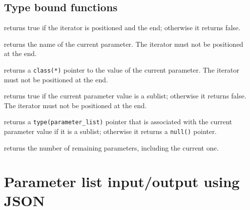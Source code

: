 \documentclass[11pt]{article}
\begin{document}
\subsection{Type bound functions}
\begin{description}[style=nextline]\setlength{\itemsep}{0pt}
\item[\texttt{at_end()}]
  returns true if the iterator is positioned and the end; otherwise it
  returns false.
\item[\texttt{name()}]
  returns the name of the current parameter.  The iterator must not be
  positioned at the end.
\item[\texttt{value()}]
  returns a \texttt{class(*)} pointer to the value of the current parameter.
  The iterator must not be positioned at the end.
\item[\texttt{is_list()}]
  returns true if the current parameter value is a sublist; otherwise it
  returns false.  The iterator must not be positioned at the end.
\item[\texttt{sublist()}]
  returns a \texttt{type(parameter_list)} pointer that is associated with
  the current parameter value if it is a sublist; otherwise it returns a
  \texttt{null()} pointer.
\item[\texttt{count()}]
  returns the number of remaining parameters, including the current one.
\end{description}

\section{Parameter list input/output using JSON}
\end{document}
